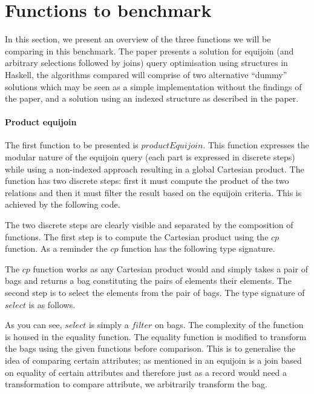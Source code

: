 \section{Functions to benchmark}\label{sec:benchmark:functions}
In this section, we present an overview of the three functions we will
be comparing in this benchmark. The paper \relalg{} presents a solution for
equijoin (and arbitrary selections followed by joins) query optimisation using
structures in Haskell, the algorithms compared will comprise of two alternative
``dummy'' solutions which may be seen as a simple implementation without the
findings of the paper, and a solution using an indexed structure as described
in the paper.

\paragraph{Product equijoin} The first function to be presented is
$productEquijoin$. This function
expresses the modular nature of the equijoin query (each part is expressed in
discrete steps) while using a non-indexed approach resulting in a global
Cartesian product.
The function has two discrete steps: first it must compute the product of the
two relations and then it must filter the result based on the equijoin criteria.
This is achieved by the following code.



\noindent
The two discrete steps are clearly visible and separated by the composition of
functions. The first step is to compute the Cartesian product using the
$cp$ function. As a reminder the $cp$ function has
the following type signature.


\noindent
The $cp$ function works as any Cartesian product would and simply takes a pair of bags and
returns a bag constituting the pairs of elements their elements.
The second step is to select the elements from the pair of
bags. The type signature of $select$ is as follows.


\noindent
As you can see, $select$ is simply a
$filter$ on bags. The complexity of the function is housed in the
equality function. The equality function is modified to transform the bags using
the given functions before comparison. This is to generalise the idea of
comparing certain attributes; as mentioned in  an
equijoin is a join based on equality of certain attributes and therefore just as
a record would need a transformation to compare attribute, we arbitrarily
transform the bag.

